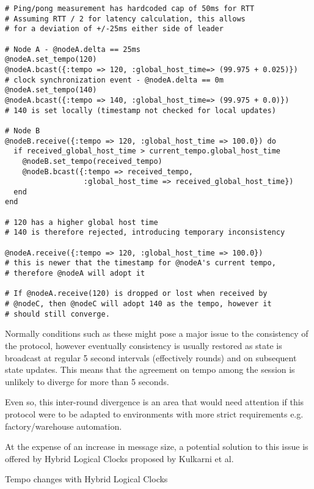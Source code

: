 \documentclass[11pt]{article} %
\theoremstyle{plain}
\theoremstyle{definition}
\begin{document}
\begin{verbatim}
# Ping/pong measurement has hardcoded cap of 50ms for RTT
# Assuming RTT / 2 for latency calculation, this allows
# for a deviation of +/-25ms either side of leader

# Node A - @nodeA.delta == 25ms
@nodeA.set_tempo(120)
@nodeA.bcast({:tempo => 120, :global_host_time=> (99.975 + 0.025)})
# clock synchronization event - @nodeA.delta == 0m
@nodeA.set_tempo(140)
@nodeA.bcast({:tempo => 140, :global_host_time=> (99.975 + 0.0)})
# 140 is set locally (timestamp not checked for local updates)

# Node B
@nodeB.receive({:tempo => 120, :global_host_time => 100.0}) do
  if received_global_host_time > current_tempo.global_host_time
    @nodeB.set_tempo(received_tempo)
    @nodeB.bcast({:tempo => received_tempo,
                  :global_host_time => received_global_host_time})
  end
end

# 120 has a higher global host time
# 140 is therefore rejected, introducing temporary inconsistency

@nodeA.receive({:tempo => 120, :global_host_time => 100.0})
# this is newer that the timestamp for @nodeA's current tempo,
# therefore @nodeA will adopt it

# If @nodeA.receive(120) is dropped or lost when received by
# @nodeC, then @nodeC will adopt 140 as the tempo, however it
# should still converge.
\end{verbatim}

Normally conditions such as these might pose a major issue to the consistency
of the protocol, however eventually consistency is usually restored as state is
broadcast at regular 5 second intervals (effectively rounds) and on subsequent
state updates. This means that the agreement on tempo among the session is
unlikely to diverge for more than 5 seconds.

Even so, this inter-round divergence is an area that would need attention if
this protocol were to be adapted to environments with more strict requirements
e.g. factory/warehouse automation.

At the expense of an increase in message size, a potential solution to this
issue is offered by Hybrid Logical Clocks\cite{kulkarni2014logical} proposed by
Kulkarni et al.

\begin{algorithm}
  \caption{Tempo changes with Hybrid Logical Clocks}\label{linkhlc}
\begin{algorithmic}[1]
\item{ }
\end{algorithmic}
\end{algorithm}
\end{document}
